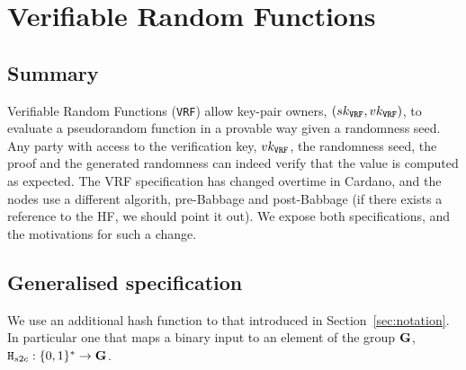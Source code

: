 \section{Verifiable Random Functions}
\label{sec:vrf}
\subsection{Summary}
\newcommand{\sk}{sk}
\newcommand{\vrf}{\texttt{VRF}\xspace}
\newcommand{\vrfsk}{\sk_{\vrf}}
\newcommand{\vrfvk}{\vk_{\vrf}}
\newcommand{\vrfoutput}{\beta}
\newcommand{\vrfproof}{\Pi}
\newcommand{\vrfkeygen}{\texttt{VrfKeyGen}}
\newcommand{\vrfgenerateproof}{\texttt{GenerateProof}}
\newcommand{\parallelsep}{\;||\;}
\newcommand{\true}{\texttt{true}}
\newcommand{\false}{\texttt{false}}


Verifiable Random Functions (\vrf) allow key-pair owners, $(\vrfsk, \vrfvk)$,
to evaluate a pseudorandom function in a provable way given a randomness seed.
Any party with access to the verification key, $\vrfvk$, the
randomness seed, the proof and the generated randomness can indeed verify
that the value is computed as expected. The VRF specification has changed
overtime in Cardano, and the nodes use a different algorith, pre-Babbage and
post-Babbage (if there exists a reference to the HF, we should point it out).
We expose both specifications, and the motivations for such a change.
\subsection{Generalised specification}
We use an additional hash function to that introduced in Section~\ref{sec:notation}. In particular
one that maps a binary input to an element of the group $\mathbf{G}$, $\texttt{H}_{s2c}: \{0,1\}^* \to \mathbf{G}$.

